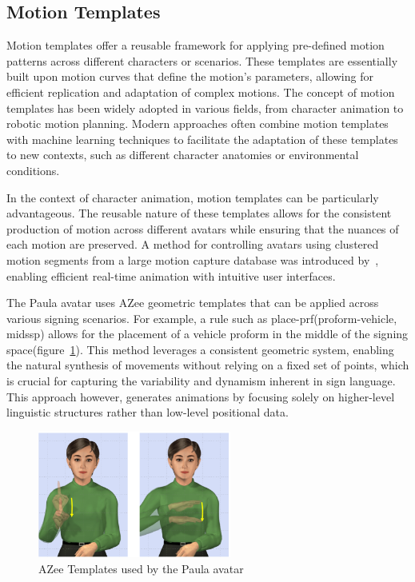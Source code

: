 \documentclass[../../main.tex]{subfiles}
\begin{document}
\subsection{Motion Templates}
\label{ch:intermediate_blocks:related_work:motion_templates}

Motion templates offer a reusable framework for applying pre-defined motion patterns across different characters or scenarios. These templates are essentially built upon motion curves that define the motion's parameters, allowing for efficient replication and adaptation of complex motions. The concept of motion templates has been widely adopted in various fields, from character animation to robotic motion planning. Modern approaches often combine motion templates with machine learning techniques to facilitate the adaptation of these templates to new contexts, such as different character anatomies or environmental conditions.

In the context of character animation, motion templates can be particularly advantageous. The reusable nature of these templates allows for the consistent production of motion across different avatars while ensuring that the nuances of each motion are preserved. A method for controlling avatars using clustered motion segments from a large motion capture database was introduced by~\cite{10.1145/566654.566607}, enabling efficient real-time animation with intuitive user interfaces.

The Paula avatar uses AZee geometric templates that can be applied across various signing scenarios. For example, a rule such as place-prf(proform-vehicle, midssp) allows for the placement of a vehicle proform in the middle of the signing space(figure~\ref{fig:azee_template_example}). This method leverages a consistent geometric system, enabling the natural synthesis of movements without relying on a fixed set of points, which is crucial for capturing the variability and dynamism inherent in sign language. This approach however, generates animations by focusing solely on higher-level linguistic structures rather than low-level positional data.

\begin{figure}
    \centering \includegraphics[width = 2.5in]{chapters/intermediate_blocks/images/azee_template_example.png}
    \caption{AZee Templates used by the Paula avatar}
    \label{fig:azee_template_example}
\end{figure}
\end{document}

